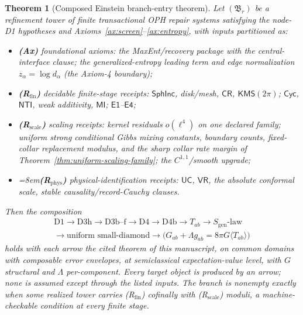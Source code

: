 \documentclass[11pt]{article}
\newtheorem{theorem}{Theorem}[section]
\begin{document}
\begin{theorem}[Composed Einstein branch-entry theorem]
\label{thm:einstein-branch-entry-composed}
Let \((\mathfrak B_r)\) be a refinement tower of finite transactional OPH
repair systems satisfying the node-D1 hypotheses and
Axioms~\ref{ax:screen}--\ref{ax:entropy}, with inputs partitioned as:
\begin{itemize}[leftmargin=2em]
\item \textbf{(Ax)} foundational axioms: the MaxEnt/recovery package with
the central-interface clause; the generalized-entropy leading term and edge
normalization \(z_\alpha=\log d_\alpha\) (the Axiom-4 boundary);
\item \textbf{(R\(_{\mathrm{fin}}\))} decidable finite-stage receipts:
\(\mathsf{SphInc}\), disk/mesh, \(\mathsf{CR}\),
\(\mathsf{KMS}(2\pi)\); \(\mathsf{Cyc}\), \(\mathsf{NTI}\), weak additivity,
\(\mathsf{MI}\); \(\mathsf{E1}\)--\(\mathsf{E4}\);
\item \textbf{(R\(_{\mathrm{scale}}\))} scaling receipts: kernel residuals
\(o(\ell^4)\) on one declared family; uniform strong conditional Gibbs
mixing constants, boundary counts, fixed-collar replacement modulus, and the
sharp collar rate margin of Theorem~\ref{thm:uniform-scaling-family}; the
\(C^{1,1}\)/smooth upgrade;
\item {\emergencystretch=8em\relax \textbf{(R\(_{\mathrm{phys}}\))} physical-identification receipts:
\(\mathsf{UC}\), \(\mathsf{VR}\), the absolute conformal scale, stable
causality/record-Cauchy clauses.\par}
\end{itemize}
Then the composition
\[
\begin{gathered}
\text{D1}\to\text{D3h}\to\text{D3b--f}\to\text{D4}\to\text{D4b}
\to T_{ab}\to S_{\mathrm{gen}}\text{-law}\\
\to\text{uniform small-diamond}\to
\bigl(G_{ab}+\Lambda g_{ab}=8\pi G\langle T_{ab}\rangle\bigr)
\end{gathered}
\]
holds with each arrow the cited theorem of this manuscript, on common
domains with composable error envelopes, at semiclassical
expectation-value level, with \(G\) structural and \(\Lambda\) per-component.
Every target object is produced by an arrow; none is assumed except through
the listed inputs. The branch is \emph{nonempty} exactly when some realized
tower carries (R\(_{\mathrm{fin}}\)) cofinally with
(R\(_{\mathrm{scale}}\)) moduli, a machine-checkable condition at every
finite stage.
\end{theorem}
\end{document}
